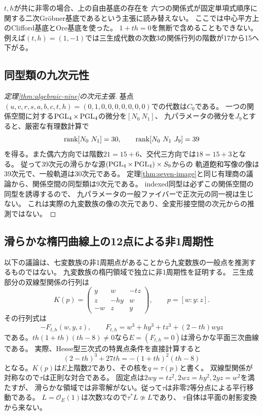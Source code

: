 \begin{remark}
$t,h$が共に非零の場合、上の自由基底の存在を
六つの関係式が固定単項式順序に関する二次Gr\"obner基底であるという主張に読み替えない。
ここでは中心平方上のClifford基底とOre基底を使った。
$1+th=0$を無断で含めることもできない。
例えば$(t,h)=(1,-1)$では三生成代数の次数3の関係行列の階数が17から15へ下がる。
\end{remark}

\subsection{同型類の九次元性}
\begin{proof}[定理\ref{thm:algebraic-nine}の次元主張]
基点$(u,v,r,s,a,b,c,t,h)=(0,1,0,0,0,0,0,0,0)$での代数は$C_0$である。
一つの関係空間に対する$\operatorname{PGL}_4\times\operatorname{PGL}_4$の微分を$[N_0\ N_1]$、
九パラメータの微分を$J_9$とすると、厳密な有理数計算で
\[
 \rk[N_0\ N_1]=30,\qquad \rk[N_0\ N_1\ J_9]=39
\]
を得る。また偶六方向では階数$21=15+6$、交代三方向では$18=15+3$となる。
従って39次元の滑らかな源$(\operatorname{PGL}_4\times\operatorname{PGL}_4)\times S_9$からの
軌道飽和写像の像は39次元で、一般軌道は30次元である。
定理\ref{thm:seven-image}と同じ有理商の議論から、関係空間の同型類は9次元である。
indexed同型は必ずこの関係空間の同型を誘導するので、
九パラメータの一般ファイバーで正次元の同一視は生じない。
これは実際の九変数族の像の次元であり、全変形接空間の次元からの推測ではない。
\end{proof}

\subsection{滑らかな楕円曲線上の12点による非1周期性}
以下の議論は、七変数族の非1周期点があることから九変数族の一般点を推測するものではない。
九変数族の楕円領域で独立に非1周期性を証明する。
三生成部分の双線型関係の行列は
\[
 K(p)=\begin{pmatrix}y&w&-tz\\z&-hy&w\\-w&z&y\end{pmatrix},\qquad p=[w:y:z].
\]
その行列式は
\begin{equation}\label{eq:elliptic-cubic}
 -F_{t,h}(w,y,z),\qquad
 F_{t,h}=w^3+hy^3+tz^3+(2-th)wyz
\end{equation}
である。$th(1+th)(th-8)\ne0$なら$E=(F_{t,h}=0)$は滑らかな平面三次曲線である。
実際、Hesse型三次式の特異点条件を直接計算すると
\[
 (2-th)^3+27th=-(1+th)^2(th-8)
\]
となる。$K(p)$は$E$上階数2であり、その核を$q=\tau(p)$と書く。
双線型関係が対称なので$\tau$は正則な対合である。
固定点は$2wy=tz^2,2wz=hy^2,2yz=w^2$を満たすが、
滑らかな領域では非零解がない。従って$\tau$は非零2等分点による平行移動である。
$L=\mathcal O_E(1)$は次数3なので$\tau^*L\not\simeq L$であり、
$\tau$自体は平面の射影変換から来ない。


